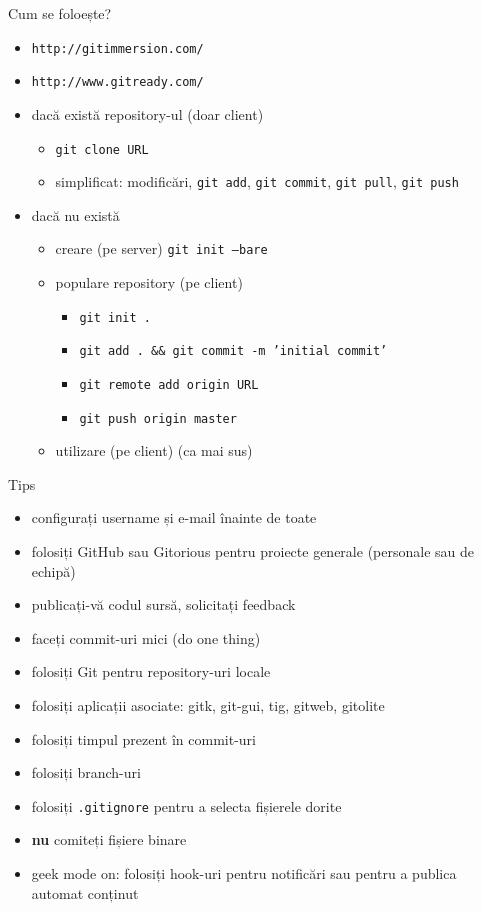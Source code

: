 \documentclass{beamer}
\begin{document}
\begin{frame}{Cum se foloește?}
  \begin{itemize}
    \item \texttt{http://gitimmersion.com/}
    \item \texttt{http://www.gitready.com/}
    \item dacă există repository-ul (doar client)
      \begin{itemize}
        \item \texttt{git clone URL}
        \item simplificat: modificări, \texttt{git add}, \texttt{git commit},
        \texttt{git pull}, \texttt{git push}
      \end{itemize}
    \item dacă nu există
      \begin{itemize}
        \item creare (pe server) \texttt{git init --bare}
        \item populare repository (pe client)
          \begin{itemize}
            \item \texttt{git init .}
            \item \texttt{git add . \&\& git commit -m 'initial commit'}
            \item \texttt{git remote add origin URL}
            \item \texttt{git push origin master}
          \end{itemize}
        \item utilizare (pe client) (ca mai sus)
      \end{itemize}
  \end{itemize}
\end{frame}

\begin{frame}{Tips}
  \begin{itemize}
    \item configurați username și e-mail înainte de toate
    \item folosiți GitHub sau Gitorious pentru proiecte generale (personale
    sau de echipă)
    \item publicați-vă codul sursă, solicitați feedback
    \item faceți commit-uri mici (do one thing)
    \item folosiți Git pentru repository-uri locale
    \item folosiți aplicații asociate: gitk, git-gui, tig, gitweb, gitolite
    \item folosiți timpul prezent în commit-uri
    \item folosiți branch-uri
    \item folosiți \texttt{.gitignore} pentru a selecta fișierele dorite
    \item \textbf{nu} comiteți fișiere binare
    \item geek mode on: folosiți hook-uri pentru notificări sau pentru a
    publica automat conținut
  \end{itemize}
\end{frame}
\end{document}

